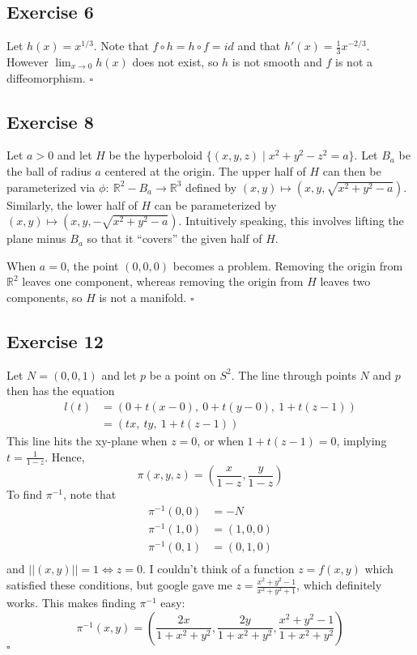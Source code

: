 \documentclass{article}
\newcommand{\R}{\mathbb{R}}
\begin{document}
\subsection*{Exercise 6}
  Let $h(x)=x^{1/3}$. Note that $f\circ h=h\circ f=id$ and that $h'(x)=
  \frac{1}{3}x^{-2/3}$. However $\lim_{x\to0}h(x)$ does not exist, so $h$ is not
  smooth and $f$ is not a diffeomorphism.
  \hfill $\square$

\subsection*{Exercise 8}
  Let $a>0$ and let $H$ be the hyperboloid $\{(x,y,z)\mid x^2+y^2-z^2=a\}$. Let
  $B_a$ be the ball of radius $a$ centered at the origin. The upper half of $H$
  can then be parameterized via $\phi\colon\ \R^2-B_a\to\R^3$ defined by $(x,y)
  \mapsto(x,y,\sqrt{x^2+y^2-a})$. Similarly, the lower half of $H$ can be
  parameterized by $(x,y)\mapsto(x,y,-\sqrt{x^2+y^2-a})$. Intuitively speaking,
  this involves lifting the plane minus $B_a$ so that it ``covers'' the given
  half of $H$.

  When $a=0$, the point $(0,0,0)$ becomes a problem. Removing the origin from
  $\R^2$ leaves one component, whereas removing the origin from $H$ leaves two
  components, so $H$ is not a manifold.
  \hfill $\square$

\subsection*{Exercise 12}
  Let $N=(0,0,1)$ and let $p$ be a point on $S^2$. The line through points $N$
  and $p$ then has the equation
  \begin{align*}
    l(t) &=(0+t(x-0),\ 0+t(y-0),\ 1+t(z-1))\\
         &=(tx,\ ty,\ 1+t(z-1))
  \end{align*}
  This line hits the xy-plane when $z=0$, or when $1+t(z-1)=0$, implying $t=
  \frac{1}{1-z}$. Hence,
    $$\pi(x,y,z) = (\frac{x}{1-z},\frac{y}{1-z})$$
  To find $\pi^{-1}$, note that
    \begin{align*}
      \pi^{-1}(0,0) &= -N\\
      \pi^{-1}(1,0) &= (1,0,0)\\
      \pi^{-1}(0,1) &= (0,1,0)\\
    \end{align*}
  and $\vert\vert(x,y)\vert\vert=1\iff z=0$. I couldn't think of a function $z=
  f(x,y)$ which satisfied these conditions, but google gave me $z=
  \frac{x^2+y^2-1}{x^2+y^2+1}$, which definitely works. This makes finding
  $\pi^{-1}$ easy:
    $$
      \pi^{-1}(x,y) = (
        \frac{2x}{1+x^2+y^2},
        \frac{2y}{1+x^2+y^2},
        \frac{x^2+y^2-1}{1+x^2+y^2}
      )
    $$
  \hfill $\square$
\end{document}
